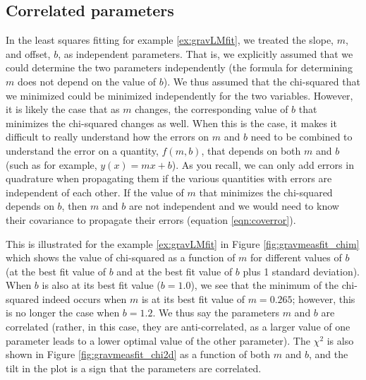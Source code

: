 \subsection{Correlated parameters}

In the least squares fitting for example \ref{ex:gravLMfit}, we treated the slope, $m$,  and offset, $b$, as independent parameters. That is, we explicitly assumed that we could determine the two parameters independently (the formula for determining $m$ does not depend on the value of $b$). We thus assumed that the chi-squared that we minimized could be minimized independently for the two variables. However, it is likely the case that as $m$ changes, the corresponding value of $b$ that minimizes the chi-squared changes as well. When this is the case, it makes it difficult to really understand how the errors on $m$ and $b$ need to be combined to understand the error on a quantity, $f(m,b)$, that depends on both $m$ and $b$ (such as for example, $y(x)=mx+b$). As you recall, we can only add errors in quadrature when propagating them if the various quantities with errors are independent of each other. If the value of $m$ that minimizes the chi-squared depends on $b$, then $m$ and $b$ are not independent and we would need to know their covariance to propagate their errors (equation \ref{eqn:coverror}).

This is illustrated for the example \ref{ex:gravLMfit} in Figure \ref{fig:gravmeasfit_chim} which shows the value of chi-squared as a function of $m$ for different values of $b$ (at the best fit value of $b$ and at the best fit value of $b$ plus 1 standard deviation). When $b$ is also at its best fit value ($b=1.0$), we see that the minimum of the chi-squared indeed occurs when $m$ is at its best fit value of $m=0.265$; however, this is no longer the case when $b=1.2$. We thus say the parameters $m$ and $b$ are correlated (rather, in this case, they are anti-correlated, as a larger value of one parameter leads to a lower optimal value of the other parameter). The $\chi^2$ is also shown in Figure \ref{fig:gravmeasfit_chi2d} as a function of both $m$ and $b$, and the tilt in the plot is a sign that the parameters are correlated.

